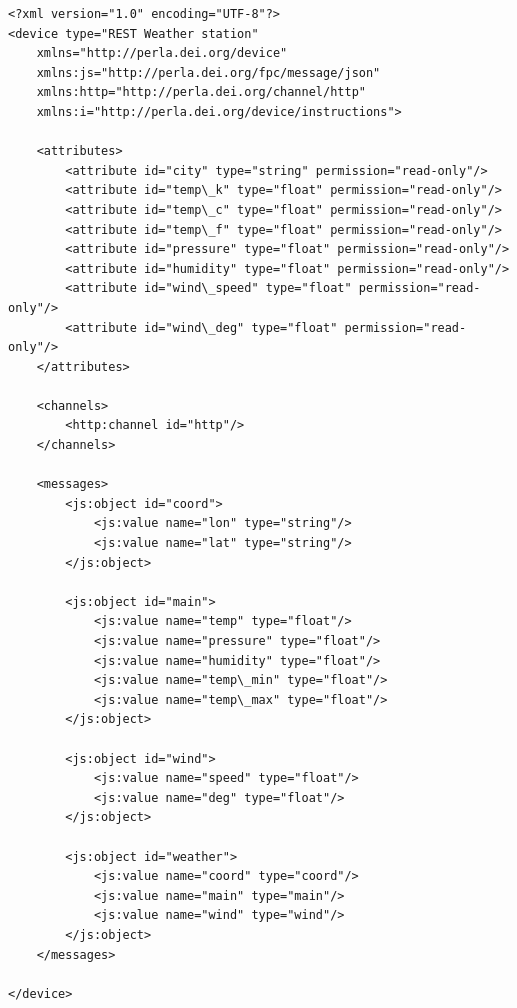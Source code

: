 \lstset{language=XML}
\begin{lstlisting}
<?xml version="1.0" encoding="UTF-8"?>
<device type="REST Weather station"
    xmlns="http://perla.dei.org/device"
    xmlns:js="http://perla.dei.org/fpc/message/json"
    xmlns:http="http://perla.dei.org/channel/http"
    xmlns:i="http://perla.dei.org/device/instructions">

    <attributes>
        <attribute id="city" type="string" permission="read-only"/>
        <attribute id="temp\_k" type="float" permission="read-only"/>
        <attribute id="temp\_c" type="float" permission="read-only"/>
        <attribute id="temp\_f" type="float" permission="read-only"/>
        <attribute id="pressure" type="float" permission="read-only"/>
        <attribute id="humidity" type="float" permission="read-only"/>
        <attribute id="wind\_speed" type="float" permission="read-only"/>
        <attribute id="wind\_deg" type="float" permission="read-only"/>
    </attributes>

    <channels>
        <http:channel id="http"/>
    </channels>

    <messages>
        <js:object id="coord">
            <js:value name="lon" type="string"/>
            <js:value name="lat" type="string"/>
        </js:object>

        <js:object id="main">
            <js:value name="temp" type="float"/>
            <js:value name="pressure" type="float"/>
            <js:value name="humidity" type="float"/>
            <js:value name="temp\_min" type="float"/>
            <js:value name="temp\_max" type="float"/>
        </js:object>

        <js:object id="wind">
            <js:value name="speed" type="float"/>
            <js:value name="deg" type="float"/>
        </js:object>

        <js:object id="weather">
            <js:value name="coord" type="coord"/>
            <js:value name="main" type="main"/>
            <js:value name="wind" type="wind"/>
        </js:object>
    </messages>

</device>
\end{lstlisting}



